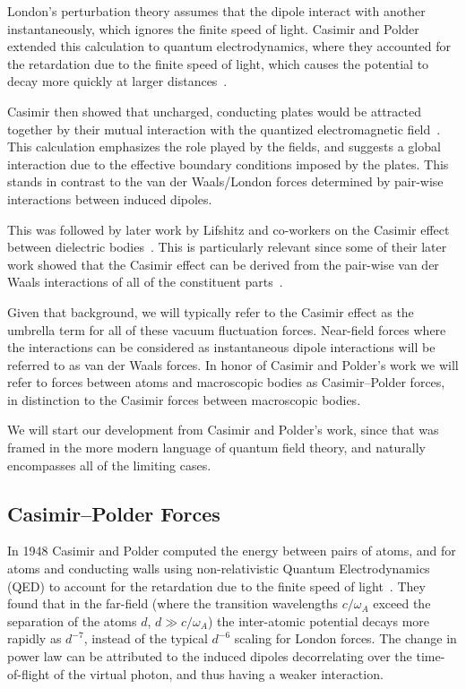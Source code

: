 London's perturbation theory assumes that the dipole interact with another instantaneously, which
ignores the finite speed of light.  Casimir and Polder extended this calculation to quantum electrodynamics,
where they accounted for the retardation due to the finite speed of light, 
which causes the potential to decay more quickly at larger distances~\cite{CasimirPolder1948}.  

Casimir then showed that uncharged, conducting plates would be attracted together by their mutual
interaction with the quantized electromagnetic field~\cite{Casimir1948}.
This calculation emphasizes the role played by the fields, and suggests
a global interaction due to the effective boundary conditions imposed by the plates.  This
stands in contrast to the van der Waals/London forces determined by pair-wise interactions between induced dipoles.

This was followed by later work by Lifshitz and co-workers on the Casimir effect between dielectric bodies~\cite{Lifshitz1956}.
This is particularly relevant since some of their later work showed that the Casimir effect can be derived 
from the pair-wise van der Waals interactions of all of the constituent parts~\cite{Dzyaloshinskii1961}.  

Given that background, we will typically refer to the Casimir effect as the umbrella term for all of these
vacuum fluctuation forces.  Near-field forces where the interactions can be considered as instantaneous
dipole interactions will be referred to as van der Waals forces.  In honor of Casimir and Polder's work
we will refer to forces between atoms and macroscopic bodies as Casimir--Polder forces, in distinction to the Casimir 
forces between macroscopic bodies.    

We will start our development from Casimir and Polder's work, since that was framed in the more modern language of quantum field theory, 
and naturally encompasses all of the limiting cases.  

\subsection{Casimir--Polder Forces}

In 1948 Casimir and Polder computed the energy between pairs of atoms, and for atoms and conducting walls 
using non-relativistic Quantum Electrodynamics (QED) to account for the retardation due to the finite speed of light~\cite{CasimirPolder1948}. 
They found that in the far-field 
(where the transition wavelengths $c/\omega_A$ exceed the separation of the atoms $d$, $d\gg c/\omega_A$)
the inter-atomic potential decays more rapidly as $d^{-7}$, instead of the typical $d^{-6}$ scaling for London forces.
 The change in power law can be 
attributed to the induced dipoles decorrelating over the time-of-flight of the virtual photon, 
and thus having a weaker interaction.
  
